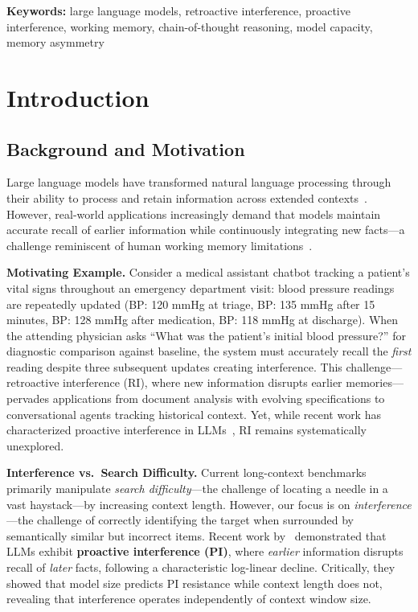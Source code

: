 \documentclass{article}
\begin{document}
\textbf{Keywords:} large language models, retroactive interference, proactive interference, working memory, chain-of-thought reasoning, model capacity, memory asymmetry

\section{Introduction}

\subsection{Background and Motivation}

Large language models have transformed natural language processing through their ability to process and retain information across extended contexts~\citep{brown2020gpt3, achiam2023gpt4}. However, real-world applications increasingly demand that models maintain accurate recall of earlier information while continuously integrating new facts---a challenge reminiscent of human working memory limitations~\citep{baddeley1974working}.

\textbf{Motivating Example.} Consider a medical assistant chatbot tracking a patient's vital signs throughout an emergency department visit: blood pressure readings are repeatedly updated (BP: 120 mmHg at triage, BP: 135 mmHg after 15 minutes, BP: 128 mmHg after medication, BP: 118 mmHg at discharge). When the attending physician asks ``What was the patient's initial blood pressure?'' for diagnostic comparison against baseline, the system must accurately recall the \textit{first} reading despite three subsequent updates creating interference. This challenge---retroactive interference (RI), where new information disrupts earlier memories---pervades applications from document analysis with evolving specifications to conversational agents tracking historical context. Yet, while recent work has characterized proactive interference in LLMs~\citep{liu2024unable}, RI remains systematically unexplored.

\textbf{Interference vs.\ Search Difficulty.} Current long-context benchmarks~\citep{liu2024lost} primarily manipulate \textit{search difficulty}---the challenge of locating a needle in a vast haystack---by increasing context length. However, our focus is on \textit{interference}---the challenge of correctly identifying the target when surrounded by semantically similar but incorrect items. Recent work by~\citet{liu2024unable} demonstrated that LLMs exhibit \textbf{proactive interference (PI)}, where \textit{earlier} information disrupts recall of \textit{later} facts, following a characteristic log-linear decline. Critically, they showed that model size predicts PI resistance while context length does not, revealing that interference operates independently of context window size.
\end{document}
